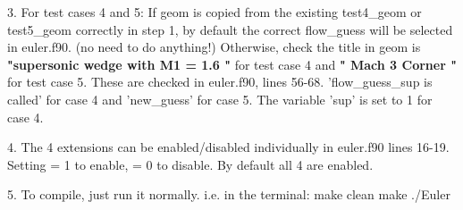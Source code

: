 \documentclass[12pt, a4paper]{article}
\begin{document}
3.  For test cases 4 and 5:
	If geom is copied from the existing test4\_geom or test5\_geom correctly in step 1, by default the correct flow\_guess will be selected in euler.f90. (no need to do anything!)
	Otherwise, check the title in geom is \textbf{"supersonic wedge with M1 = 1.6 "} for test case 4 and \textbf{" Mach 3 Corner "} for test case 5.
	These are checked in euler.f90, lines 56-68. 'flow\_guess\_sup is called' for case 4 and 'new\_guess' for case 5. The variable 'sup' is set to 1 for case 4.

4.  The 4 extensions can be enabled/disabled individually in euler.f90 lines 16-19. Setting = 1 to enable, = 0 to disable. By default all 4 are enabled.

5.  To compile, just run it normally. i.e. in the terminal:
	make clean
	make
	./Euler
\end{document}
